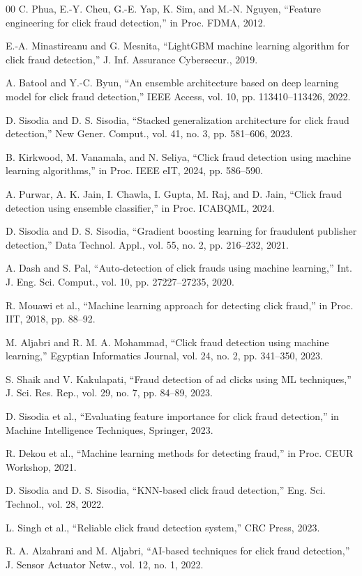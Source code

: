 \documentclass[conference]{IEEEtran}
\begin{document}
\begin{thebibliography}{00}
 C. Phua, E.-Y. Cheu, G.-E. Yap, K. Sim, and M.-N. Nguyen, ``Feature engineering for click fraud detection,'' in Proc. FDMA, 2012.

 E.-A. Minastireanu and G. Mesnita, ``LightGBM machine learning algorithm for click fraud detection,'' J. Inf. Assurance Cybersecur., 2019.

 A. Batool and Y.-C. Byun, ``An ensemble architecture based on deep learning model for click fraud detection,'' IEEE Access, vol. 10, pp. 113410--113426, 2022.

 D. Sisodia and D. S. Sisodia, ``Stacked generalization architecture for click fraud detection,'' New Gener. Comput., vol. 41, no. 3, pp. 581--606, 2023.

 B. Kirkwood, M. Vanamala, and N. Seliya, ``Click fraud detection using machine learning algorithms,'' in Proc. IEEE eIT, 2024, pp. 586--590.

 A. Purwar, A. K. Jain, I. Chawla, I. Gupta, M. Raj, and D. Jain, ``Click fraud detection using ensemble classifier,'' in Proc. ICABQML, 2024.

 D. Sisodia and D. S. Sisodia, ``Gradient boosting learning for fraudulent publisher detection,'' Data Technol. Appl., vol. 55, no. 2, pp. 216--232, 2021.

 A. Dash and S. Pal, ``Auto-detection of click frauds using machine learning,'' Int. J. Eng. Sci. Comput., vol. 10, pp. 27227--27235, 2020.

 R. Mouawi et al., ``Machine learning approach for detecting click fraud,'' in Proc. IIT, 2018, pp. 88--92.

 M. Aljabri and R. M. A. Mohammad, ``Click fraud detection using machine learning,'' Egyptian Informatics Journal, vol. 24, no. 2, pp. 341--350, 2023.

 S. Shaik and V. Kakulapati, ``Fraud detection of ad clicks using ML techniques,'' J. Sci. Res. Rep., vol. 29, no. 7, pp. 84--89, 2023.

 D. Sisodia et al., ``Evaluating feature importance for click fraud detection,'' in Machine Intelligence Techniques, Springer, 2023.

 R. Dekou et al., ``Machine learning methods for detecting fraud,'' in Proc. CEUR Workshop, 2021.

 D. Sisodia and D. S. Sisodia, ``KNN-based click fraud detection,'' Eng. Sci. Technol., vol. 28, 2022.

 L. Singh et al., ``Reliable click fraud detection system,'' CRC Press, 2023.

 R. A. Alzahrani and M. Aljabri, ``AI-based techniques for click fraud detection,'' J. Sensor Actuator Netw., vol. 12, no. 1, 2022.

\end{thebibliography}
\end{document}
